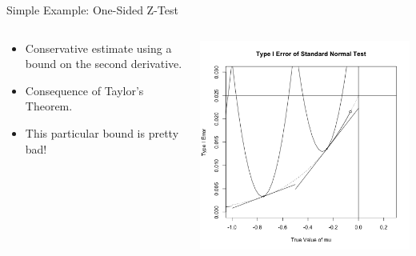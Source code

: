 \begin{frame}{Simple Example: One-Sided Z-Test}
\begin{columns}
\begin{column}{.3\textwidth}
\begin{itemize}
\item Conservative estimate using a bound on the second derivative.
\item Consequence of Taylor’s Theorem.
\item This particular bound is pretty bad!
\end{itemize}
\end{column}

\begin{column}{.7\textwidth}
\includegraphics[width=\textwidth]{figures/z-test-8.png}
\end{column}
\end{columns}
\end{frame}

